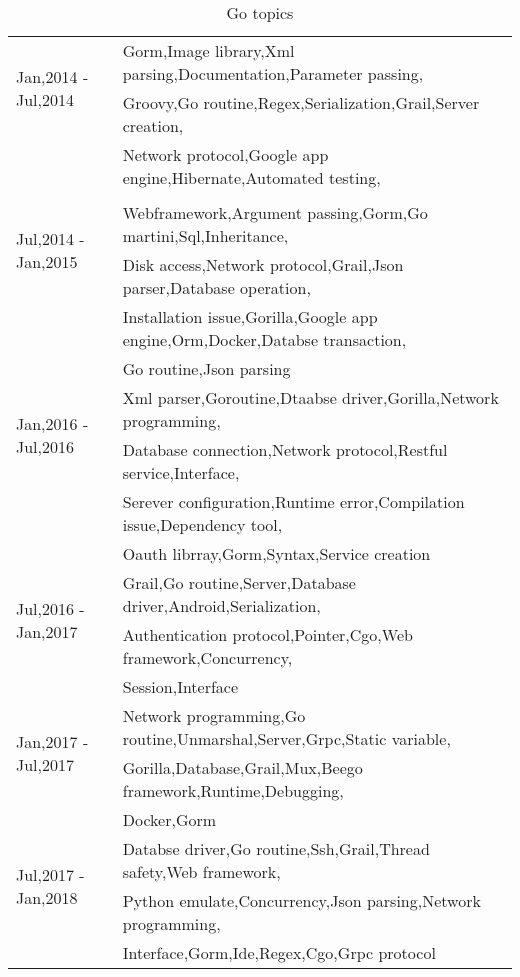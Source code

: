 \begin{table}[]
\begin{tabular}{|l|l|}
\multirow{2}{*}{Jan,2014 - Jul,2014} & Gorm,Image  library,Xml parsing,Documentation,Parameter passing,\\ & Groovy,Go routine,Regex,Serialization,Grail,Server creation,\\ & Network protocol,Google app engine,Hibernate,Automated testing,\\\\ \hline
\multirow{2}{*}{Jul,2014 - Jan,2015} & Webframework,Argument passing,Gorm,Go martini,Sql,Inheritance,\\ & Disk access,Network protocol,Grail,Json parser,Database operation,\\ & Installation issue,Gorilla,Google app engine,Orm,Docker,Databse transaction,\\ & Go routine,Json parsing\\ \hline
\multirow{2}{*}{Jan,2016 - Jul,2016} & Xml parser,Goroutine,Dtaabse driver,Gorilla,Network programming,\\ & Database connection,Network protocol,Restful service,Interface,\\ & Serever configuration,Runtime error,Compilation issue,Dependency tool,\\ & Oauth librray,Gorm,Syntax,Service creation\\ \hline
\multirow{2}{*}{Jul,2016 - Jan,2017} & Grail,Go routine,Server,Database driver,Android,Serialization,\\ & Authentication protocol,Pointer,Cgo,Web framework,Concurrency,\\ & Session,Interface\\ \hline
\multirow{2}{*}{Jan,2017 - Jul,2017} & Network programming,Go routine,Unmarshal,Server,Grpc,Static variable,\\ & Gorilla,Database,Grail,Mux,Beego framework,Runtime,Debugging,\\ & Docker,Gorm\\ \hline
\multirow{2}{*}{Jul,2017 - Jan,2018} & Databse driver,Go routine,Ssh,Grail,Thread safety,Web framework,\\ & Python emulate,Concurrency,Json parsing,Network programming,\\ & Interface,Gorm,Ide,Regex,Cgo,Grpc protocol\\ \hline

\end{tabular}
\caption{Go topics}
\label{table:Go topics}
\end{table}